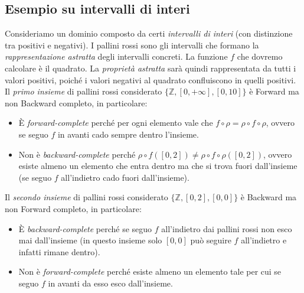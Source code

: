 \documentclass[a4paper,oneside,titlepage]{book}
\begin{document}
\subsection{Esempio su intervalli di interi} %
Consideriamo un dominio composto da certi \textit{intervalli di interi} (con distinzione tra positivi e negativi). I pallini rossi sono gli intervalli che formano la \textit{rappresentazione astratta} degli intervalli concreti. La funzione $f$ che dovremo calcolare è il quadrato. La \textit{proprietà astratta} sarà quindi rappresentata da tutti i valori positivi, poiché i valori negativi al quadrato confluiscono in quelli positivi. Il \textit{primo insieme} di pallini rossi considerato $\{ \mathbb{Z}, [0,+\infty], [0,10] \}$ è Forward ma non Backward completo, in particolare:
\begin{itemize}
    \item \`{E} \textit{forward-complete} perché per ogni elemento vale che $f \circ \rho = \rho \circ f \circ \rho$, ovvero se seguo $f$ in avanti cado sempre dentro l'insieme.
    \item Non è \textit{backward-complete} perché $\rho \circ f ([0,2]) \neq \rho \circ f \circ \rho ([0,2])$, ovvero esiste almeno un elemento che entra dentro ma che si trova fuori dall'insieme (se seguo $f$ all'indietro cado fuori dall'insieme).
\end{itemize}
Il \textit{secondo insieme} di pallini rossi considerato $\{ \mathbb{Z}, [0,2], [0,0] \}$ è Backward ma non Forward completo, in particolare:
\begin{itemize}
    \item \`{E} \textit{backward-complete} perché se seguo $f$ all'indietro dai pallini rossi non esco mai dall'insieme (in questo insieme solo $[0,0]$ può seguire $f$ all'indietro e infatti rimane dentro).
    \item Non è \textit{forward-complete} perché esiste almeno un elemento tale per cui se seguo $f$ in avanti da esso esco dall'insieme.
\end{itemize}
\end{document}
